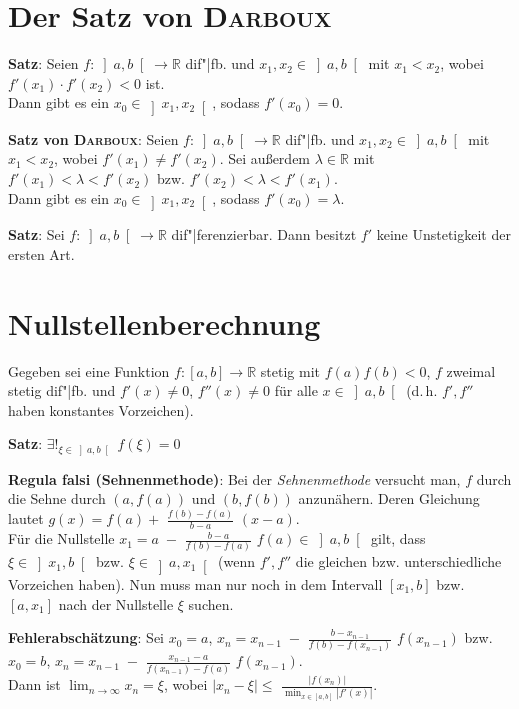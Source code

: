 \section{%
    Der Satz von \textsc{Darboux}%
}

\textbf{Satz}:
Seien $f: \left]a,b\right[ \rightarrow \mathbb{R}$ dif"|fb. und
$x_1, x_2 \in \left]a,b\right[$ mit $x_1 < x_2$, wobei
$f'(x_1) \cdot f'(x_2) < 0$ ist. \\
Dann gibt es ein $x_0 \in \left]x_1,x_2\right[$, sodass $f'(x_0) = 0$.

\textbf{Satz von \textsc{Darboux}}:
Seien $f: \left]a,b\right[ \rightarrow \mathbb{R}$ dif"|fb. und
$x_1, x_2 \in \left]a,b\right[$ mit $x_1 < x_2$, wobei $f'(x_1) \not= f'(x_2)$.
Sei außerdem $\lambda \in \mathbb{R}$ mit $f'(x_1) < \lambda < f'(x_2)$ bzw.
$f'(x_2) < \lambda < f'(x_1)$. \\
Dann gibt es ein $x_0 \in \left]x_1,x_2\right[$, sodass $f'(x_0) = \lambda$.

\textbf{Satz}:
Sei $f: \left]a,b\right[ \rightarrow \mathbb{R}$ dif"|ferenzierbar. \quad
Dann besitzt $f'$ keine Unstetigkeit der ersten Art.

\section{%
    Nullstellenberechnung%
}

Gegeben sei eine Funktion $f: [a,b] \rightarrow \mathbb{R}$ stetig mit
$f(a) f(b) < 0$, $f$ zweimal stetig dif"|fb. und $f'(x) \not= 0$,
$f''(x) \not= 0$ für alle $x \in \left]a,b\right[$ (d.\,h. $f', f''$ haben
konstantes Vorzeichen).

\textbf{Satz}: $\exists!_{\xi \in \left]a,b\right[}\; f(\xi) = 0$

\linie

\textbf{Regula falsi (Sehnenmethode)}:
Bei der \emph{Sehnenmethode} versucht man, $f$ durch die Sehne durch
$(a, f(a))$ und $(b, f(b))$ anzunähern.
Deren Gleichung lautet $g(x) = f(a) +$ {\large $\frac{f(b) - f(a)}{b - a}$}
$(x - a)$. \\
Für die Nullstelle $x_1 = a \;-$ {\large $\frac{b - a}{f(b) - f(a)}$}
$f(a) \in \left]a,b\right[$ gilt, dass $\xi \in \left]x_1,b\right[$
bzw. $\xi \in \left]a,x_1\right[$
(wenn $f', f''$ die gleichen bzw. unterschiedliche Vorzeichen haben).
Nun muss man nur noch in dem Intervall $[x_1,b]$
bzw. $[a,x_1]$ nach der Nullstelle $\xi$ suchen.

\textbf{Fehlerabschätzung}:
Sei $x_0 = a$, $x_n = x_{n-1} \;-$
{\large $\frac{b - x_{n-1}}{f(b) - f(x_{n-1})}$} $f(x_{n-1})$ bzw. \\
$x_0 = b$,
$x_n = x_{n-1} \;-$
{\large $\frac{x_{n-1} - a}{f(x_{n-1}) - f(a)}$} $f(x_{n-1})$. \\
Dann ist $\lim_{n \to \infty} x_n = \xi$, wobei
$|x_n - \xi| \le$ {\large $\frac{|f(x_n)|}{\min_{x \in [a,b]} |f'(x)|}$}.


